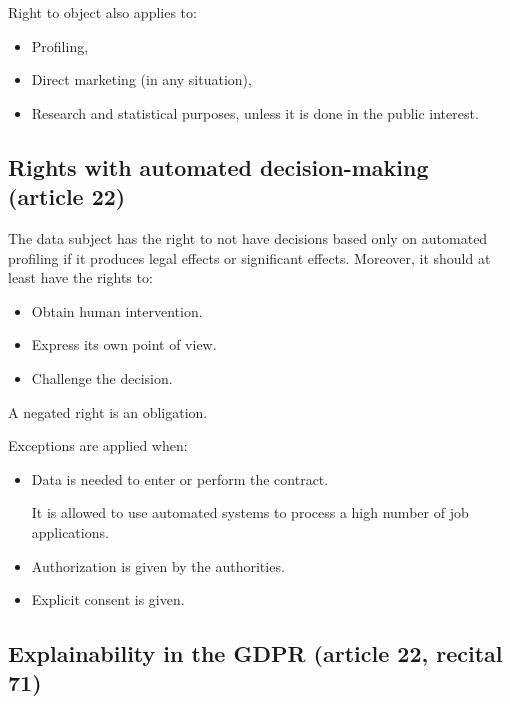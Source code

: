 \begin{remark}
    Right to object also applies to:
    \begin{itemize}
        \item Profiling,
        \item Direct marketing (in any situation),
        \item Research and statistical purposes, unless it is done in the public interest.
    \end{itemize}
\end{remark}


\subsection{Rights with automated decision-making (article 22)} 

The data subject has the right to not have decisions based only on automated profiling if it produces legal effects or significant effects. Moreover, it should at least have the rights to:
\begin{itemize}
    \item Obtain human intervention.
    \item Express its own point of view.
    \item Challenge the decision.
\end{itemize}

\begin{remark}
    A negated right is an obligation.
\end{remark}

Exceptions are applied when:
\begin{itemize}
    \item Data is needed to enter or perform the contract.
        \begin{example}
            It is allowed to use automated systems to process a high number of job applications.
        \end{example}
    \item Authorization is given by the authorities.
    \item Explicit consent is given.
\end{itemize} 


\subsection{Explainability in the GDPR (article 22, recital 71)} 

